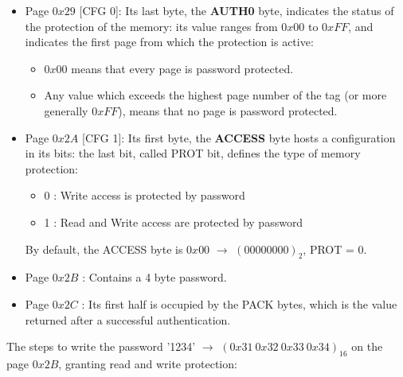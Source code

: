 \documentclass[target=bach,aauheader=,style=]{thud}
\begin{document}
\begin{itemize}
	\item Page $0x29$ [CFG 0]: Its last byte, the \textbf{AUTH0} byte, indicates the status of the protection of the memory: its value ranges from $0x00$ to $0xFF$, and indicates the first page from which the protection is active:
	\begin{itemize}
		\item $0x00$ means that every page is password protected.
		\item Any value which exceeds the highest page number of the tag (or more generally $0xFF$), means that no page is password protected.
	\end{itemize}
	\item Page $0x2A$ [CFG 1]: Its first byte, the \textbf{ACCESS} byte hosts a configuration in its bits: the last bit, called PROT bit, defines the type of memory protection:
	\begin{itemize}
		\item 0 : Write access is protected by password
		\item 1 : Read and Write access are protected by password
	\end{itemize}
	By default, the ACCESS byte is $0x00$ $\rightarrow$ $(00000000)_2$, PROT = 0.
	\item Page $0x2B$ : Contains a 4 byte password.
	\item Page $0x2C$ : Its first half is occupied by the PACK bytes, which is the value returned after a successful authentication.
\end{itemize}
\newpage
The steps to write the password '1234' $\rightarrow$ $(0x31\ 0x32\ 0x33\ 0x34)_{16}$ on the page $0x2B$, granting read and write protection:
\end{document}
